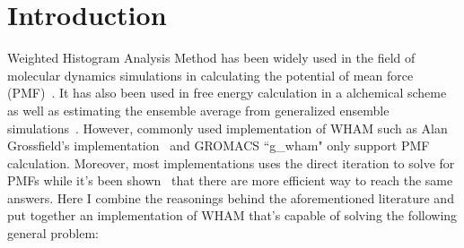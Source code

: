 \section{Introduction}

Weighted Histogram Analysis Method has been widely used in the field of 
molecular dynamics simulations in calculating the potential of mean force
(PMF)~\cite{Kumar1992,Roux1995275}.
It has also been used in free energy calculation in a alchemical scheme~\cite{Kumar1992} as 
well as estimating the ensemble average from generalized ensemble simulations~\cite{Chodera2007}.
However, commonly used implementation of WHAM such as Alan Grossfield's 
implementation~\cite{wham205} and GROMACS ``g\_wham" only support PMF calculation.
Moreover, most implementations uses the direct iteration to solve for PMFs 
while it's been shown~\cite{Zhu2012} that there are more efficient way to 
reach the same answers. Here I combine the reasonings behind the aforementioned
literature and put together an implementation of WHAM that's capable of solving 
the following general problem:

